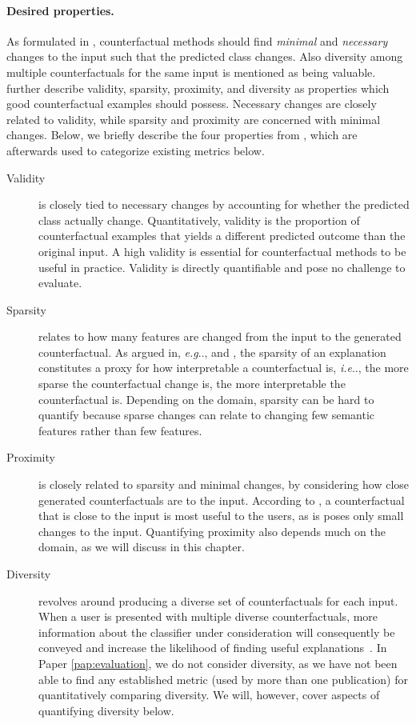 \documentclass[11pt,a4paper,twoside,openright,final]{memoir}
\makeatletter
\DeclareRobustCommand\onedot{\futurelet\@let@token\@onedot}
\def\@onedot{\ifx\@let@token.\else.\null\fi\xspace}
\def\eg{\emph{e.g}\onedot} \def\Eg{\emph{E.g}\onedot}
\def\ie{\emph{i.e}\onedot} \def\Ie{\emph{I.e}\onedot}
\newcommand*{\paperref}[1]{Paper \hyperref[#1]{\ref{#1}}}
\makeatother
\begin{document}
\paragraph{Desired properties.}
As formulated in \citet{Wachter2017}, counterfactual methods should find \emph{minimal} and \emph{necessary} changes to the input such that the predicted class changes.
Also diversity among multiple counterfactuals for the same input is mentioned as being valuable.
\citet{Mothilal2020} further describe validity, sparsity, proximity, and diversity as properties which good counterfactual examples should possess.
Necessary changes are closely related to validity, while sparsity and proximity are concerned with minimal changes. 
Below, we briefly describe the four properties from \cite{Mothilal2020}, which are afterwards used to categorize existing metrics below.

\begin{description} 
    \item[Validity] is closely tied to necessary changes by accounting for whether the predicted class actually change. 
    Quantitatively, validity is the proportion of counterfactual examples that yields a different predicted outcome than the original input.
    A high validity is essential for counterfactual methods to be useful in practice.
    Validity is directly quantifiable and pose no challenge to evaluate.
    
    \item[Sparsity] relates to how many features are changed from the input to the generated counterfactual.
    As argued in, \eg, \cite{Wachter2017} and \cite{Grath2018}, the sparsity of an explanation constitutes a proxy for how interpretable a counterfactual is, \ie, the more sparse the counterfactual change is, the more interpretable the counterfactual is. 
    Depending on the domain, sparsity can be hard to quantify because sparse changes can relate to changing few semantic features rather than few features.
    
    \item[Proximity] is closely related to sparsity and minimal changes, by considering how close generated counterfactuals are to the input.
    According to \cite{Mothilal2020}, a counterfactual that is close to the input is most useful to the users, as is poses only small changes to the input.
    Quantifying proximity also depends much on the domain, as we will discuss in this chapter. 
    
    \item[Diversity] revolves around producing a diverse set of counterfactuals for each input.
    When a user is presented with multiple diverse counterfactuals, more information about the classifier under consideration will consequently be conveyed and increase the likelihood of finding useful explanations~\cite{Rodriguez2021}.
    In \paperref{pap:evaluation}, we do not consider diversity, as we have not been able to find any established metric (used by more than one publication) for quantitatively comparing diversity.
    We will, however, cover aspects of quantifying diversity below.
\end{description}
\end{document}

